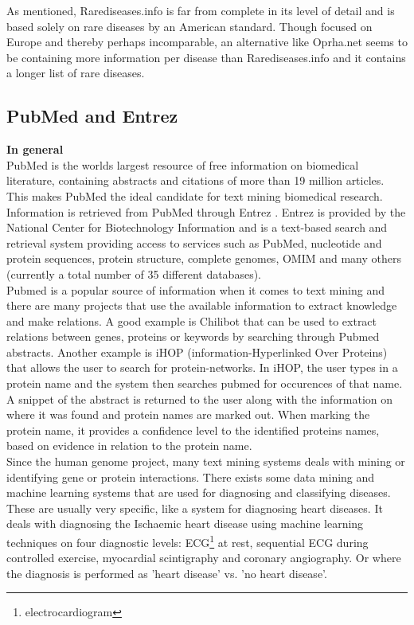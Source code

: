 As mentioned, Rarediseases.info is far from complete in its level of detail and is based solely on rare diseases by an American standard. Though focused on Europe and thereby perhaps incomparable, an alternative like Oprha.net seems to be containing more information per disease than Rarediseases.info and it contains a longer list of rare diseases.

\subsection{PubMed and Entrez\label{PubmedEntrez}}

\textbf{In general} \\ 
PubMed \cite{PubMedFactSheet} is the worlds largest resource of free
information on biomedical literature, containing abstracts and
citations of more than 19 million articles. This makes PubMed the
ideal candidate for text mining biomedical research.\\

Information is retrieved from PubMed through Entrez
\cite{Entrez}. Entrez is provided by the National Center for
Biotechnology Information \cite{NCBIFactSheet} and is a text-based
search and retrieval system providing access to services such as
PubMed, nucleotide and protein sequences, protein structure, complete
genomes, OMIM and many others (currently a total number of 35
different databases).\\

Pubmed is a popular source of information when it comes to text
mining and there are many projects that use the available information
to extract knowledge and make relations. A good example is Chilibot
\cite{Chilibot} that can be used to extract relations between genes,
proteins or keywords by searching through Pubmed abstracts. Another
example is iHOP \cite{IHOP} (information-Hyperlinked Over Proteins)
that allows the user to search for protein-networks. In iHOP, the user
types in a protein name and the system then searches pubmed for
occurences of that name. A snippet of the abstract is returned to the
user along with the information on where it was found and protein
names are marked out. When marking the protein name, it provides a
confidence level to the identified proteins names, based on evidence
in relation to the protein name.\\

Since the human genome project, many text mining systems deals with
mining or identifying gene or protein interactions. There exists some
data mining and machine learning systems that are used for diagnosing
and classifying diseases. These are usually very specific, like
\cite{DiagnosingIschaemicHeartDiseaseML} a system for diagnosing heart
diseases. It deals with diagnosing the Ischaemic heart disease using
machine learning techniques on four diagnostic levels:
ECG\footnote{electrocardiogram} at rest, sequential ECG during
controlled exercise, myocardial scintigraphy and coronary
angiography. Or \cite{SVMHeartDiseaseClassification} where the
diagnosis is performed as 'heart disease' vs. 'no heart disease'.\\

